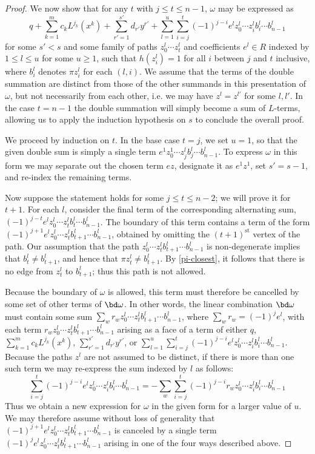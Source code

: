 \begin{proof}
We now show that for any $t$ with $j \leq t \leq n-1$, $\omega$ may be expressed as
\[
q + \sum_{k=1}^m c_k L^{j_k}(x^k) + \sum_{r' = 1}^{s'} d_{r'} y^{r'} + \sum_{l = 1}^{u} \sum_{i = j}^{t} (-1)^{j-i} e^l z^l_0 \cdots z^l_i b^l_i \cdots b^l_{n-1}
\]
for some $s' < s$ and some family of paths $z^l_0 \cdots z^l_t$ and coefficients $e^l \in R$ indexed by $1 \leq l \leq u$ for some $u \geq 1$, such that $h(z^l_i) = 1$ for all $i$ between $j$ and $t$ inclusive, where $b^l_i$ denotes $\pi z^l_i$ for each $(l,i)$. We assume that the terms of the double summation are distinct from those of the other summands in this presentation of $\omega$, but not necessarily from each other, i.e. we may have $z^l = z^{l'}$ for some $l, l'$. In the case $t = n-1$ the double summation will simply become a sum of $L$-terms, allowing us to apply the induction hypothesis on $s$ to conclude the overall proof.

We proceed by induction on $t$. In the base case $t = j$, we set $u = 1$, so that the given double sum is simply a single term $ e^1 z^1_0 \cdots z^l_j b^l_j \cdots b^l_{n-1}$. To express $\omega$ in this form we may separate out the chosen term $e z$, designate it as $e^1 z^1$, set $s' = s-1$, and re-index the remaining terms.

Now suppose the statement holds for some $j \leq t \leq n - 2$; we will prove it for $t + 1$. For each $l$, consider the final term of the corresponding alternating sum, $(-1)^{j-t}e^l z^l_0 \cdots z^l_t b^l_t \cdots b^l_{n-1}$. The boundary of this term contains a term of the form $(-1)^{j+1} e^l z^l_0 \cdots z^l_t b^l_{t+1} \cdots b^l_{n-1}$, obtained by omitting the $(t+1)^{\mathrm{st}}$ vertex of the path. Our assumption that the path $z^l_0 \cdots z^l_t b^l_{t+1} \cdots b^l_{n-1}$ is non-degenerate implies that $b^l_t \neq b^l_{t+1}$, and hence that $\pi z^l_t \neq b^l_{t+1}$. By \cref{pi-closest}, it follows that there is no edge from $z^l_t$ to $b^l_{t+1}$; thus this path is not allowed. 

Because the boundary of $\omega$ is allowed, this term must therefore be cancelled by some set of other terms of $\bd \omega$. In other words, the linear combination $\bd \omega$ must contain some sum $\sum_{w} r_w z^l_0 \cdots z^l_t b^l_{t+1} \cdots b^l_{n-1}$, where $\sum_w r_w = (-1)^j e^l$, with each term $r_w z^l_0 \cdots z^l_t b^l_{t+1} \cdots b^l_{n-1}$ arising as a face of a term of either $q$, $\sum_{k=1}^m c_k L^{j_k}(x^k)$, $\sum_{r' = 1}^{s'} d_{r'} y^{r'}$, or $\sum_{l=1}^u \sum_{i = j}^{t} (-1)^{j-i} e^l z^l_0 \cdots z^l_i b^l_i \cdots b^l_{n-1}$. Because the paths $z^l$ are not assumed to be distinct, if there is more than one such term we may re-express the sum indexed by $l$ as follows:
\[
\sum_{i=j}^t (-1)^{j-i}e^l z^l_0 \cdots z^l_i b^l_i \cdots b^l_{n-1} 
= -\sum_w \sum_{i=j}^t (-1)^{j-i}r_w z^l_0 \cdots z^l_i b^l_i \cdots b^l_{n-1}
\]
Thus we obtain a new expression for $\omega$ in the given form for a larger value of $u$. We may therefore assume without loss of generality that $(-1)^{j+1} e^l z^l_0 \cdots z^l_t b^l_{t+1} \cdots b^l_{n-1}$ is canceled by a single term $(-1)^{j} e^l z^l_0 \cdots z^l_t b^l_{t+1} \cdots b^l_{n-1}$ arising in one of the four ways described above.


\end{proof}

